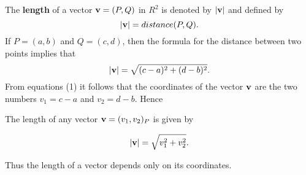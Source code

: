 The \textbf{length} of a vector $\mbox{\bf{v}} = (P, Q)$ in $R^2$ is denoted by $|\mbox{\bf{v}}|$ and defined by
$$
|\mbox{\bf{v}}| = distance(P, Q).
$$
\noindent If $P = (a, b)$ and $Q = (c, d)$, then the formula for the distance between two points implies that
$$
|\mbox{\bf{v}}| = \sqrt{(c - a)^2 + (d - b)^2} .
$$
\noindent From equations (1) it follows that the coordinates of the vector $\mbox{\bf{v}}$ are the two numbers $v_1 = c - a$ and $v_2 = d - b$. Hence

\begin{theorem} The length of any vector $\mbox{\bf{v}} = (v_1, v_2)_P$ is given by

$$
|\mbox{\bf{v}}|= \sqrt {v_1^2 + v_2^2} . 
$$
\end{theorem}

Thus the length of a vector depends only on its coordinates.

